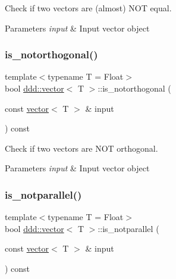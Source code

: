 Check if two vectors are (almost) N\+OT equal. 


\begin{DoxyParams}{Parameters}
{\em input} & Input vector object \\
\hline
\end{DoxyParams}
\mbox{\label{classddd_1_1vector_ab08843c258a0e50ff940ece9c03ad774}} 
\subsubsection{\texorpdfstring{is\+\_\+notorthogonal()}{is\_notorthogonal()}}
{\footnotesize\ttfamily template$<$typename T = Float$>$ \\
bool \hyperlink{classddd_1_1vector}{ddd\+::vector}$<$ T $>$\+::is\+\_\+notorthogonal (\begin{DoxyParamCaption}\item[{const \hyperlink{classddd_1_1vector}{vector}$<$ T $>$ \&}]{input }\end{DoxyParamCaption}) const\hspace{0.3cm}{\ttfamily [inline]}}



Check if two vectors are N\+OT orthogonal. 


\begin{DoxyParams}{Parameters}
{\em input} & Input vector object \\
\hline
\end{DoxyParams}
\mbox{\label{classddd_1_1vector_a4d7791d777455365aed4a1476da78d67}} 
\subsubsection{\texorpdfstring{is\+\_\+notparallel()}{is\_notparallel()}}
{\footnotesize\ttfamily template$<$typename T = Float$>$ \\
bool \hyperlink{classddd_1_1vector}{ddd\+::vector}$<$ T $>$\+::is\+\_\+notparallel (\begin{DoxyParamCaption}\item[{const \hyperlink{classddd_1_1vector}{vector}$<$ T $>$ \&}]{input }\end{DoxyParamCaption}) const\hspace{0.3cm}{\ttfamily [inline]}}



